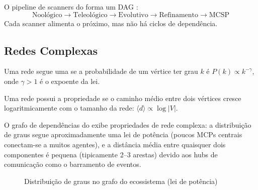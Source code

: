 \begin{exemplo}
    O pipeline de scanners do \opencodeeco{} forma um DAG
    \cite{opencode2026scanner}:
    \[
    \text{Noológico} \to \text{Teleológico} \to \text{Evolutivo} \to
    \text{Refinamento} \to \text{MCSP}
    \]
    Cada scanner alimenta o próximo, mas não há ciclos de dependência.
\end{exemplo}

\subsection{Redes Complexas}

\begin{definicao}
    Uma rede segue uma  se a probabilidade de um
    vértice ter grau $k$ é $P(k) \propto k^{-\gamma}$, onde $\gamma > 1$ é o
    expoente da lei.
\end{definicao}

\begin{definicao}
    Uma rede possui a propriedade  se o caminho médio
    entre dois vértices cresce logaritmicamente com o tamanho da rede:
    $\langle d \rangle \propto \log |V|$.
\end{definicao}

\begin{exemplo}
    O grafo de dependências do \opencodeeco{} exibe propriedades de rede
    complexa: a distribuição de graus segue aproximadamente uma lei de
    potência (poucos MCPs centrais conectam-se a muitos agentes), e a
    distância média entre quaisquer dois componentes é pequena (tipicamente
    2--3 arestas) devido aos hubs de comunicação como o barramento de
    eventos.
\end{exemplo}

\begin{figure}[htb]
    \centering
    \caption{Distribuição de graus no grafo do ecossistema (lei de potência)}
    \label{fig:lei-potencia}
\end{figure}

